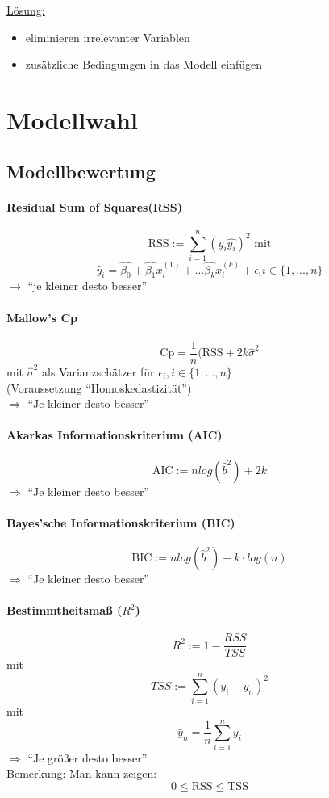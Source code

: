 \documentclass[10pt]{report}
\theoremstyle{definition}
\begin{document}
\underline{Lösung:}
\begin{itemize}
 \item eliminieren irrelevanter Variablen
 \item zusätzliche Bedingungen in das Modell einfügen
\end{itemize}

\section{Modellwahl}
\subsection{Modellbewertung}
\paragraph{Residual Sum of Squares(RSS)}
\[ \text{RSS}:= \sum\limits_{i=1}^{n} (y_i \hat{y_i})^2 \text{ mit} \]
\[ \hat{y}_i =  \hat{\beta_{0}} + \hat{\beta_{1}} x_{i}^{(1)} + ... \hat{\beta_{k}} x_{i}^{(k)} + \epsilon_{i} i \in \{ 1,...,n \} \]
$\rightarrow$ ``je kleiner desto besser''

\paragraph{Mallow's Cp}
\[ \text{Cp}= \frac{1}{n}(\text{RSS} + 2k \hat{\sigma}^{2} \]
mit $\hat{\sigma}^{2}$ als Varianzschätzer für $\epsilon_i , i \in \{1,\dots,n\}$ \\
(Voraussetzung ``Homoskedastizität'')\\
$\Rightarrow$ ``Je kleiner desto besser''
\paragraph{Akarkas Informationskriterium (AIC) }
\[ \text{AIC} := n log (\hat{b}^2) + 2k \]
$\Rightarrow$ ``Je kleiner desto besser''

\paragraph{Bayes'sche Informationskriterium (BIC)}
\[ \text{BIC} := n log (\hat{b}^2) + k \cdot log(n) \]
$\Rightarrow$ ``Je kleiner desto besser''

\paragraph{Bestimmtheitsmaß ($R^2$)}
\[ R^2 := 1 - \frac{RSS}{TSS} \]
mit 
\[ TSS := \sum\limits_{i=1}^n (y_i - \bar{y_n} )^2 \]
mit
\[ \bar{y}_n = \frac{1}{n} \sum\limits_{i=1}^{n}y_i \]
$\Rightarrow$ ``Je größer desto besser'' \\
\underline{Bemerkung:} Man kann zeigen:
\[ 0 \leq \text{RSS} \leq \text{TSS} \]
\end{document}
